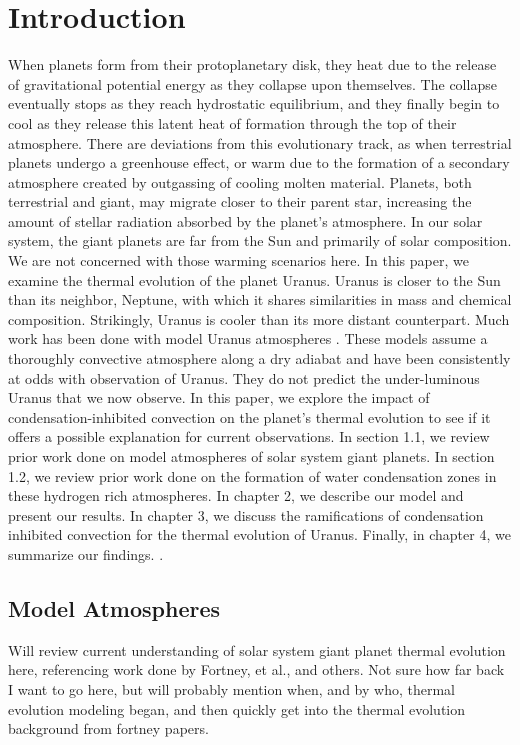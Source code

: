 \documentclass[11pt]{ucscthesisbs}
\begin{document}
\chapter{Introduction}
When planets form from their protoplanetary disk, they heat due to the release of gravitational potential energy as they collapse upon themselves. The collapse eventually stops as they reach hydrostatic equilibrium, and they finally begin to cool as they release this latent heat of formation through the top of their atmosphere. There are deviations from this evolutionary track, as when terrestrial planets undergo a greenhouse effect, or warm due to the formation of a secondary atmosphere created by outgassing of cooling molten material. Planets, both terrestrial and giant, may migrate closer to their parent star, increasing the amount of stellar radiation absorbed by the planet's atmosphere. In our solar system, the giant planets are far from the Sun and primarily of solar composition. We are not concerned with those warming scenarios here. In this paper, we examine the thermal evolution of the planet Uranus. Uranus is closer to the Sun than its neighbor, Neptune, with which it shares similarities in mass and chemical composition. Strikingly, Uranus is cooler than its more distant counterpart. Much work has been done with model Uranus atmospheres \citep{fortney_2011}. These models assume a thoroughly convective atmosphere along a dry adiabat and have been consistently at odds with observation of Uranus. They do not predict the under-luminous Uranus that we now observe. In this paper, we explore the impact of condensation-inhibited convection on the planet's thermal evolution to see if it offers a possible explanation for current observations. In section 1.1, we review prior work done on model atmospheres of solar system giant planets. In section 1.2, we review prior work done on the formation of water condensation zones in these hydrogen rich atmospheres. In chapter 2, we describe our model and present our results. In chapter 3, we discuss the ramifications of condensation inhibited convection for the thermal evolution of Uranus. Finally, in chapter 4, we summarize our findings.\citep{friedson_2017} \citep{leconte_2017}.



\section{Model Atmospheres}

Will review current understanding of solar system giant planet thermal evolution here, referencing work done by Fortney, et al., and others. Not sure how far back I want to go here, but will probably mention when, and by who, thermal evolution modeling began, and then quickly get into the thermal evolution background from fortney papers.
\end{document}
